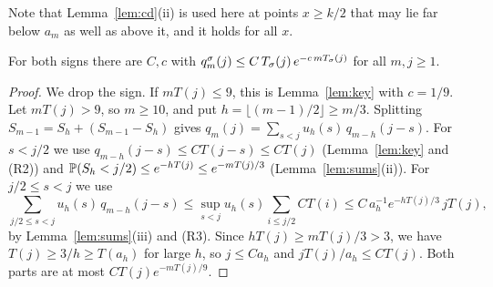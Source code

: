 Note that Lemma~\ref{lem:cd}(ii) is used here at points $x\ge k/2$ that may lie far
below $a_m$ as well as above it, and it holds for all $x$.

\begin{lemma}[decay in $m$]\label{lem:decay}
For both signs there are $C,c$ with $q^\sigma_m(j)\le C\,T_\sigma(j)\,e^{-c\,mT_\sigma(j)}$ for
all $m,j\ge1$.
\end{lemma}

\begin{proof}
We drop the sign. If $mT(j)\le9$, this is Lemma~\ref{lem:key} with $c=1/9$. Let
$mT(j)>9$, so $m\ge10$, and put $h=\lfloor(m-1)/2\rfloor\ge m/3$. Splitting
$S_{m-1}=S_h+(S_{m-1}-S_h)$ gives $q_m(j)=\sum_{s<j}u_h(s)\,q_{m-h}(j-s)$. For $s<j/2$
we use $q_{m-h}(j-s)\le CT(j-s)\le CT(j)$ (Lemma~\ref{lem:key} and (R2)) and
$\mathbb{P}(S_h<j/2)\le e^{-hT(j)}\le e^{-mT(j)/3}$ (Lemma~\ref{lem:sums}(ii)). For
$j/2\le s<j$ we use
\[
 \sum_{j/2\le s<j}u_h(s)\,q_{m-h}(j-s)\le\sup_{s<j}u_h(s)\sum_{i\le j/2}CT(i)
 \le C\,a_h^{-1}e^{-hT(j)/3}\,jT(j),
\]
by Lemma~\ref{lem:sums}(iii) and (R3). Since $hT(j)\ge mT(j)/3>3$, we have
$T(j)\ge3/h\ge T(a_h)$ for large $h$, so $j\le Ca_h$ and $jT(j)/a_h\le CT(j)$. Both
parts are at most $CT(j)e^{-mT(j)/9}$.
\end{proof}
